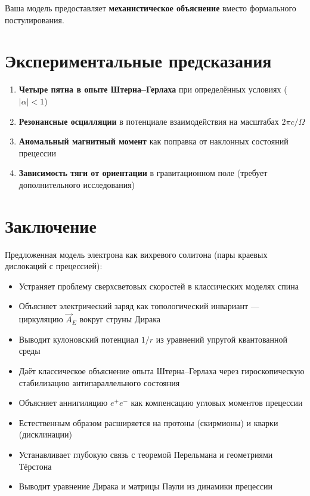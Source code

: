 \documentclass[12pt]{article}
\begin{document}
Ваша модель предоставляет \textbf{механистическое объяснение} вместо формального постулирования.

\section{Экспериментальные предсказания}

\begin{enumerate}
\item \textbf{Четыре пятна в опыте Штерна–Герлаха} при определённых условиях ($|\alpha| < 1$)
\item \textbf{Резонансные осцилляции} в потенциале взаимодействия на масштабах $2\pi c / \Omega$
\item \textbf{Аномальный магнитный момент} как поправка от наклонных состояний прецессии
\item \textbf{Зависимость тяги от ориентации} в гравитационном поле (требует дополнительного исследования)
\end{enumerate}

\section{Заключение}

Предложенная модель электрона как вихревого солитона (пары краевых дислокаций с прецессией):

\begin{itemize}
\item Устраняет проблему сверхсветовых скоростей в классических моделях спина
\item Объясняет электрический заряд как топологический инвариант — циркуляцию $\vec{A}_E$ вокруг струны Дирака
\item Выводит кулоновский потенциал $1/r$ из уравнений упругой квантованной среды
\item Даёт классическое объяснение опыта Штерна–Герлаха через гироскопическую стабилизацию антипараллельного состояния
\item Объясняет аннигиляцию $e^+e^-$ как компенсацию угловых моментов прецессии
\item Естественным образом расширяется на протоны (скирмионы) и кварки (дисклинации)
\item Устанавливает глубокую связь с теоремой Перельмана и геометриями Тёрстона
\item Выводит уравнение Дирака и матрицы Паули из динамики прецессии
\end{itemize}
\end{document}
